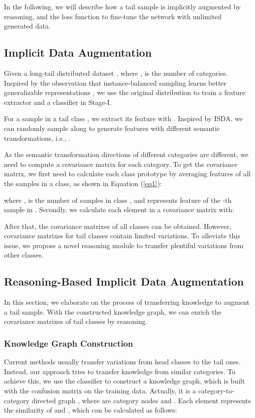 \documentclass[letterpaper]{article} \usepackage{aaai22}  \usepackage{times}  \usepackage{helvet}  \usepackage{courier}  \usepackage[hyphens]{url}  \usepackage{graphicx} \usepackage{bm}
\begin{document}
	In the following, we will describe how a tail sample is implicitly augmented by reasoning, and the loss function to fine-tune the network with unlimited generated data.
	
	\subsection{Implicit Data Augmentation}
	Given a long-tail distributed dataset  , where ,  is the number of categories. Inspired by the observation that instance-balanced sampling learns better generalizable representations \cite{kang2019decoupling}, we use the original distribution to train a feature extractor  and a classifier  in Stage-I. 
	
	For a sample  in a tail class , we extract its feature with . Inspired by ISDA, we can randomly sample along  to generate features with different semantic transformations,  i.e., .


	As the semantic transformation directions of different categories are different, we need to compute a covariance matrix for each category. To get the covariance matrix, we first need to calculate each class prototype by averaging features of all the samples in a class, as shown in Equation (\ref{eq1}): 
	
	
	where ,  is the number of samples in class , and  represents feature of the -th sample in . Secondly, we calculate each element in a covariance matrix with: 
	
	
	After that, the covariance matrixes of all classes  can be obtained. 
However, covariance matrixes for tail classes contain limited variations.
	To alleviate this issue, we propose a novel reasoning module to transfer plentiful variations from other classes. 
	


	
	




	


	
	
	\subsection{Reasoning-Based Implicit Data Augmentation}
	In this section, we elaborate on the process of transferring knowledge to augment a tail sample. With the constructed knowledge graph, we can enrich the covariance matrixes of tail classes by reasoning.
	\subsubsection{Knowledge Graph Construction}
	Current methods usually transfer variations from head classes to the tail ones. Instead, our approach tries to transfer knowledge from similar categories. To achieve this, we use the classifier  to construct a knowledge graph, which is built with the confusion matrix on the training data. Actually, it is a category-to-category directed graph , where  are category nodes and . Each element  represents the similarity of  and , which can be calculated as follows:
	
\end{document}
